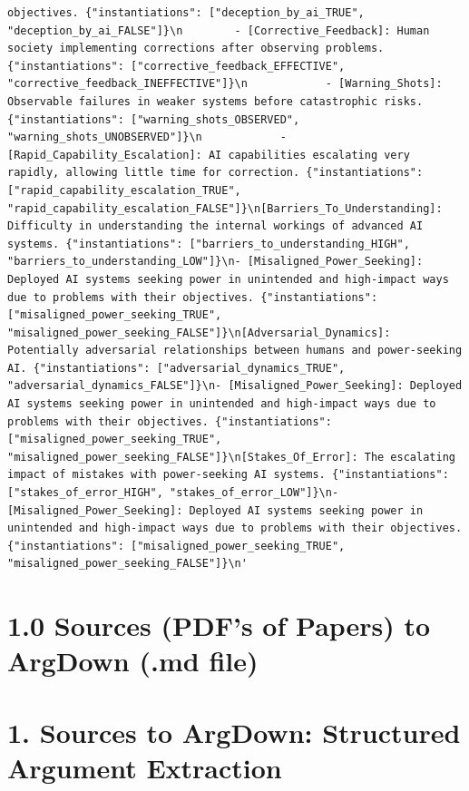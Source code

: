 \documentclass[
  11pt,
  letterpaper,
]{book}
\begin{document}
\begin{verbatim}
objectives. {"instantiations": ["deception_by_ai_TRUE", "deception_by_ai_FALSE"]}\n        - [Corrective_Feedback]: Human society implementing corrections after observing problems. {"instantiations": ["corrective_feedback_EFFECTIVE", "corrective_feedback_INEFFECTIVE"]}\n            - [Warning_Shots]: Observable failures in weaker systems before catastrophic risks. {"instantiations": ["warning_shots_OBSERVED", "warning_shots_UNOBSERVED"]}\n            - [Rapid_Capability_Escalation]: AI capabilities escalating very rapidly, allowing little time for correction. {"instantiations": ["rapid_capability_escalation_TRUE", "rapid_capability_escalation_FALSE"]}\n[Barriers_To_Understanding]: Difficulty in understanding the internal workings of advanced AI systems. {"instantiations": ["barriers_to_understanding_HIGH", "barriers_to_understanding_LOW"]}\n- [Misaligned_Power_Seeking]: Deployed AI systems seeking power in unintended and high-impact ways due to problems with their objectives. {"instantiations": ["misaligned_power_seeking_TRUE", "misaligned_power_seeking_FALSE"]}\n[Adversarial_Dynamics]: Potentially adversarial relationships between humans and power-seeking AI. {"instantiations": ["adversarial_dynamics_TRUE", "adversarial_dynamics_FALSE"]}\n- [Misaligned_Power_Seeking]: Deployed AI systems seeking power in unintended and high-impact ways due to problems with their objectives. {"instantiations": ["misaligned_power_seeking_TRUE", "misaligned_power_seeking_FALSE"]}\n[Stakes_Of_Error]: The escalating impact of mistakes with power-seeking AI systems. {"instantiations": ["stakes_of_error_HIGH", "stakes_of_error_LOW"]}\n- [Misaligned_Power_Seeking]: Deployed AI systems seeking power in unintended and high-impact ways due to problems with their objectives. {"instantiations": ["misaligned_power_seeking_TRUE", "misaligned_power_seeking_FALSE"]}\n'
\end{verbatim}

\chapter{1.0 Sources (PDF's of Papers) to ArgDown (.md
file)}\label{sources-pdfs-of-papers-to-argdown-.md-file}

\chapter{1. Sources to ArgDown: Structured Argument
Extraction}\label{sources-to-argdown-structured-argument-extraction}
\end{document}

